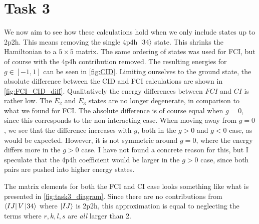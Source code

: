 \documentclass{article}
\newcommand{\inner}[3]{\bra{#1}#2\ket{#3}}
\begin{document}
\section*{Task 3}
    We now aim to see how these calculations hold when we only include states up to 2p2h. This means removing the single 4p4h $\ket{34}$ state. This shrinks the Hamiltonian to a $5 \times 5$ matrix. The same ordering of states was used for FCI, but of course with the 4p4h contribution removed. The resulting energies for $g \in [-1,1]$ can be seen in \cref{fig:CID}. Limiting ourselves to the ground state, the absolute difference between the CID and FCI calculations are shown in \cref{fig:FCI_CID_diff}. Qualitatively the energy differences between $FCI$ and $CI$ is rather low. The $E_2$ and $E_3$ states are no longer degenerate, in comparison to what we found for FCI. The absolute difference is of course equal when $g=0$, since this corresponds to the non-interacting case. When moving away from $g = 0$, we see that the difference increases with $g$, both in the $g > 0$ and $g < 0$ case, as would be expected. However, it is not symmetric around $g = 0$, where the energy differs more in the $g > 0$ case. I have not found a concrete reason for this, but I speculate that the 4p4h coefficient would be larger in the $g > 0$ case, since both pairs are pushed into higher energy states.  
    
    The matrix elements for both the FCI and CI case looks something like what is presented in \cref{fig:task3_diagram}. Since there are no contributions from $\inner{IJ}{V}{34}$ where $\ket{IJ}$ is 2p2h, this approximation is equal to neglecting the terms where $r,k,l,s$ are \textit{all} larger than 2.  
\end{document}
